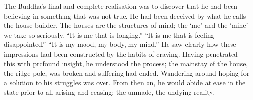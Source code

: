 \begin{dhpRefl}

The Buddha's final and complete realisation was to discover that he
had been believing in something that was not true. He had been
deceived by what he calls the house-builder. The houses are the
structures of mind; the `me' and the `mine' we take so seriously. ``It
is me that is longing.'' ``It is me that is feeling disappointed.'' ``It
is my mood, my body, my mind.''  He saw clearly how these impressions
had been constructed by the habits of craving. Having penetrated this
with profound insight, he understood the process; the mainstay of
the house, the ridge-pole, was broken and suffering had ended.
Wandering around hoping for a solution to his struggles was over.
From then on, he would abide at ease in the state prior to all
arising and ceasing; the unmade, the undying reality.

\end{dhpRefl}

